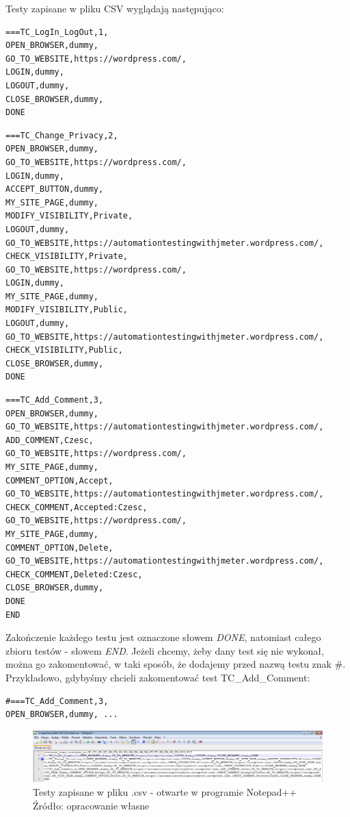 \newpage

Testy zapisane w pliku CSV wyglądają następująco:

\begin{lstlisting}
===TC_LogIn_LogOut,1,
OPEN_BROWSER,dummy,
GO_TO_WEBSITE,https://wordpress.com/,
LOGIN,dummy,
LOGOUT,dummy,
CLOSE_BROWSER,dummy,
DONE
\end{lstlisting}

\begin{lstlisting}
===TC_Change_Privacy,2,
OPEN_BROWSER,dummy,
GO_TO_WEBSITE,https://wordpress.com/,
LOGIN,dummy,
ACCEPT_BUTTON,dummy,
MY_SITE_PAGE,dummy,
MODIFY_VISIBILITY,Private,
LOGOUT,dummy,
GO_TO_WEBSITE,https://automationtestingwithjmeter.wordpress.com/,
CHECK_VISIBILITY,Private,
GO_TO_WEBSITE,https://wordpress.com/,
LOGIN,dummy,
MY_SITE_PAGE,dummy,
MODIFY_VISIBILITY,Public,
LOGOUT,dummy,
GO_TO_WEBSITE,https://automationtestingwithjmeter.wordpress.com/,
CHECK_VISIBILITY,Public,
CLOSE_BROWSER,dummy,
DONE
\end{lstlisting}

\begin{lstlisting}
===TC_Add_Comment,3,
OPEN_BROWSER,dummy,
GO_TO_WEBSITE,https://automationtestingwithjmeter.wordpress.com/,
ADD_COMMENT,Czesc,
GO_TO_WEBSITE,https://wordpress.com/,
MY_SITE_PAGE,dummy,
COMMENT_OPTION,Accept,
GO_TO_WEBSITE,https://automationtestingwithjmeter.wordpress.com/,
CHECK_COMMENT,Accepted:Czesc,
GO_TO_WEBSITE,https://wordpress.com/,
MY_SITE_PAGE,dummy,
COMMENT_OPTION,Delete,
GO_TO_WEBSITE,https://automationtestingwithjmeter.wordpress.com/,
CHECK_COMMENT,Deleted:Czesc,
CLOSE_BROWSER,dummy,
DONE
END
\end{lstlisting}

Zakończenie każdego testu jest oznaczone słowem \textit{DONE}, natomiast całego zbioru testów - słowem \textit{END}. Jeżeli chcemy, żeby dany test się nie wykonał, można go zakomentować, w taki sposób, że dodajemy przed nazwą testu znak \#. Przykładowo, gdybyśmy chcieli zakomentować test TC\_Add\_Comment:
\begin{lstlisting}
#===TC_Add_Comment,3,
OPEN_BROWSER,dummy, ...
\end{lstlisting}

\begin{figure}[H]
\centering
\captionsetup{justification=centering}
\includegraphics[width=1\textwidth]{NotePad.PNG}
\caption[Testy zapisane w pliku .csv - otwarte w programie Notepad++]{\label{fig:ham}Testy zapisane w pliku .csv - otwarte w programie Notepad++  \\ Źródło: opracowanie własne}
\end{figure}

